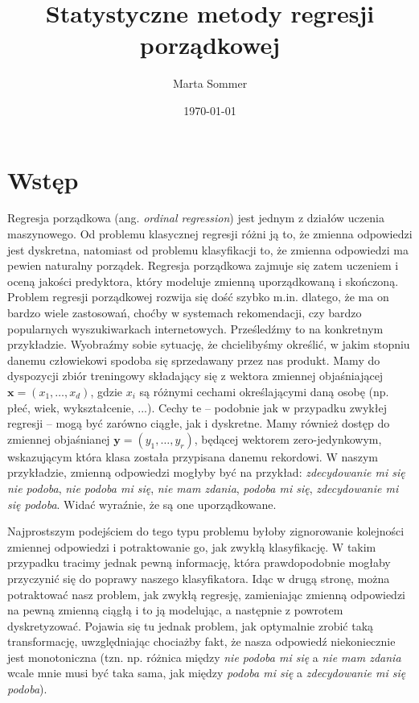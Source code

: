 \documentclass{mini}
\title{Statystyczne metody regresji porządkowej}
\author{Marta Sommer}
\date{\today}
\begin{document}
\maketitle
\tableofcontents

\chapter*{Wstęp}

Regresja porządkowa (ang. \textit{ordinal regression}) jest jednym z działów uczenia maszynowego. Od problemu klasycznej regresji różni ją to, że zmienna odpowiedzi jest dyskretna, natomiast od problemu klasyfikacji to, że zmienna odpowiedzi ma pewien naturalny porządek. Regresja porządkowa zajmuje się zatem uczeniem i oceną jakości predyktora, który modeluje zmienną uporządkowaną i skończoną. Problem regresji porządkowej rozwija się dość szybko m.in. dlatego, że ma on bardzo wiele zastosowań, choćby w systemach rekomendacji, czy bardzo popularnych wyszukiwarkach internetowych. Prześledźmy to na konkretnym przykładzie. Wyobraźmy sobie sytuację, że chcielibyśmy określić, w jakim stopniu danemu człowiekowi spodoba się sprzedawany przez nas produkt. Mamy do dyspozycji zbiór treningowy składający się z wektora zmiennej objaśniającej $\textbf{x}=(x_1, \ldots, x_d)$, gdzie $x_i$ są różnymi cechami określającymi daną osobę (np. płeć, wiek, wykształcenie, ...). Cechy te -- podobnie jak w przypadku zwykłej regresji -- mogą być zarówno ciągłe, jak i dyskretne. Mamy również dostęp do zmiennej objaśnianej $\textbf{y}=(y_1, \ldots, y_r)$, będącej wektorem zero-jedynkowym, wskazującym która klasa została przypisana danemu rekordowi. W naszym przykładzie, zmienną odpowiedzi mogłyby być na przykład: \textit{zdecydowanie mi się nie podoba}, \textit{nie podoba mi się}, \textit{nie mam zdania}, \textit{podoba mi się}, \textit{zdecydowanie mi się podoba}. Widać wyraźnie, że są one uporządkowane.

Najprostszym podejściem do tego typu problemu byłoby zignorowanie kolejności zmiennej odpowiedzi i potraktowanie go, jak zwykłą klasyfikację. W takim przypadku tracimy jednak pewną informację, która prawdopodobnie mogłaby przyczynić się do poprawy naszego klasyfikatora. Idąc w drugą stronę, można potraktować nasz problem, jak zwykłą regresję, zamieniając zmienną odpowiedzi na pewną zmienną ciągłą i to ją modelując, a następnie z powrotem dyskretyzować. Pojawia się tu jednak problem, jak optymalnie zrobić taką transformację, uwzględniając chociażby fakt, że nasza odpowiedź niekoniecznie jest monotoniczna (tzn. np. różnica między \textit{nie podoba mi się} a \textit{nie mam zdania} wcale mnie musi być taka sama, jak między \textit{podoba mi się} a \textit{zdecydowanie mi się podoba}). 
\end{document}

